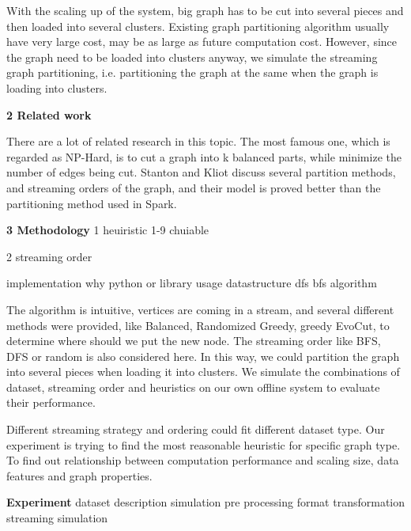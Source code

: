 \documentclass[12pt]{article}
\begin{document}
With the scaling up of the system, big graph has to be cut into several pieces and then loaded into several clusters. Existing graph partitioning algorithm usually have very large cost, may be as large as future computation cost. However, since the graph need to be loaded into clusters anyway, we simulate the streaming graph partitioning, i.e. partitioning the graph at the same when the graph is loading into clusters. 

\textbf{2 Related work}

There are a lot of related research in this topic. The most famous one, which is regarded as NP-Hard, is to cut a graph into k balanced parts, while minimize the number of edges being cut. Stanton and Kliot discuss several partition methods, and streaming orders of the graph, and their model is proved better than the partitioning method used in Spark.

\textbf{3 Methodology}
1 heuiristic
	1-9 chuiable

2 streaming order

implementation
	why python or library usage
	datastructure
	dfs bfs algorithm

The algorithm is intuitive, vertices are coming in a stream, and several different methods were provided, like Balanced, Randomized Greedy, greedy EvoCut, to determine where should we put the new node. The streaming order like BFS, DFS or random is also considered here. In this way, we could partition the graph into several pieces when loading it into clusters. We simulate the combinations of dataset, streaming order and heuristics on our own offline system to evaluate their performance.

Different streaming strategy and ordering could fit different dataset type. Our experiment is trying to find the most reasonable heuristic for specific graph type. To find out relationship between computation performance and scaling size, data features and graph properties.

\textbf{Experiment}
dataset description
simulation
	pre processing
	format transformation
	streaming simulation
\end{document}
